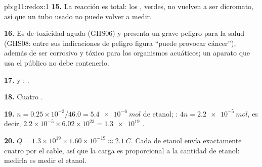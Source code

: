 \begin{solution}{pb:g11:redox:1}
\textbf{15.} La reacción es total: los  , verdes, no
vuelven a ser dicromato, así que un tubo usado no puede volver a medir.

\textbf{16.} Es de toxicidad aguda (GHS06) y presenta un grave peligro
para la salud (GHS08: entre sus indicaciones de peligro figura ``puede
provocar cáncer''), además de ser corrosivo y tóxico para los organismos
acuáticos; un aparato que usa el público no debe contenerlo.

\textbf{17.}  y
:
.

\textbf{18.} Cuatro .

\textbf{19.} $n = 0.25\times 10^{-3}/46.0 = \qty{5.4e-6}{mol}$ de
etanol; : $4n = \qty{2.2e-5}{mol}$, es decir,
$2.2\times 10^{-5}\times 6.02\times 10^{23} = \num{1.3e19}$ .

\textbf{20.} $Q = 1.3\times 10^{19}\times 1.60\times 10^{-19} \approx
\qty{2.1}{C}$. Cada  de etanol envía exactamente cuatro
 por el cable, así que la carga es proporcional a la cantidad
de etanol: medirla es medir el etanol.
\end{solution}
